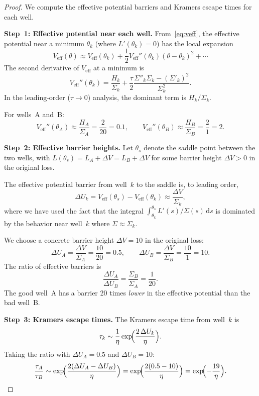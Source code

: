 \documentclass[11pt,a4paper]{article}
\newcommand{\dif}{\,\mathrm{d}}
\newcommand{\Veff}{V_{\mathrm{eff}}}
\begin{document}
\begin{proof}
We compute the effective potential barriers and Kramers escape times for each
well.

\medskip\noindent\textbf{Step~1: Effective potential near each well.}
From~\eqref{eq:veff}, the effective potential near a minimum $\theta_k$
(where $L'(\theta_k) = 0$) has the local expansion
\[
  \Veff(\theta)
  \approx \Veff(\theta_k)
    + \frac{1}{2}\Veff''(\theta_k)(\theta - \theta_k)^2 + \cdots
\]
The second derivative of $\Veff$ at a minimum is
\[
  \Veff''(\theta_k)
  = \frac{H_k}{\Sigma_k}
    + \frac{\tau}{2}\frac{\Sigma''_k\Sigma_k - (\Sigma'_k)^2}{\Sigma_k^2}.
\]
In the leading-order ($\tau\to 0$) analysis, the dominant term is $H_k/\Sigma_k$.

For wells~A and~B:
\[
  \Veff''(\theta_A) \approx \frac{H_A}{\Sigma_A} = \frac{2}{20} = 0.1,
  \qquad
  \Veff''(\theta_B) \approx \frac{H_B}{\Sigma_B} = \frac{2}{1} = 2.
\]

\medskip\noindent\textbf{Step~2: Effective barrier heights.}
Let $\theta_s$ denote the saddle point between the two wells, with
$L(\theta_s) = L_A + \Delta V = L_B + \Delta V$ for some barrier height
$\Delta V > 0$ in the original loss.

The effective potential barrier from well~$k$ to the saddle is, to leading
order,
\[
  \Delta U_k
  = \Veff(\theta_s) - \Veff(\theta_k)
  \approx \frac{\Delta V}{\Sigma_k},
\]
where we have used the fact that the integral
$\int_{\theta_k}^{\theta_s} L'(s)/\Sigma(s)\dif s$ is dominated by the
behavior near well~$k$ where $\Sigma\approx\Sigma_k$.

We choose a concrete barrier height $\Delta V = 10$ in the original loss:
\[
  \Delta U_A = \frac{\Delta V}{\Sigma_A} = \frac{10}{20} = 0.5,
  \qquad
  \Delta U_B = \frac{\Delta V}{\Sigma_B} = \frac{10}{1} = 10.
\]
The ratio of effective barriers is
\[
  \frac{\Delta U_A}{\Delta U_B}
  = \frac{\Sigma_B}{\Sigma_A}
  = \frac{1}{20}.
\]
The good well~A has a barrier 20 times \emph{lower} in the effective potential
than the bad well~B.

\medskip\noindent\textbf{Step~3: Kramers escape times.}
The Kramers escape time from well~$k$ is \citep{kramers1940brownian}
\[
  \tau_k \sim \frac{1}{\eta}\exp\!\Bigl(\frac{2\,\Delta U_k}{\eta}\Bigr).
\]
Taking the ratio with $\Delta U_A = 0.5$ and $\Delta U_B = 10$:
\begin{equation}\label{eq:f4-ratio}
  \frac{\tau_A}{\tau_B}
  \sim \exp\!\Bigl(\frac{2(\Delta U_A - \Delta U_B)}{\eta}\Bigr)
  = \exp\!\Bigl(\frac{2(0.5 - 10)}{\eta}\Bigr)
  = \exp\!\Bigl(-\frac{19}{\eta}\Bigr).
\end{equation}


\end{proof}
\end{document}
